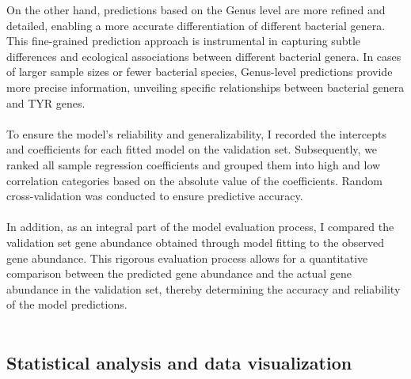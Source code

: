 \documentclass[12pt]{article}
\begin{document}
On the other hand, predictions based on the Genus level are more refined and detailed, enabling a more accurate differentiation of different bacterial genera. This fine-grained prediction approach is instrumental in capturing subtle differences and ecological associations between different bacterial genera. In cases of larger sample sizes or fewer bacterial species, Genus-level predictions provide more precise information, unveiling specific relationships between bacterial genera and TYR genes.\\\\
To ensure the model's reliability and generalizability, I recorded the intercepts and coefficients for each fitted model on the validation set. Subsequently, we ranked all sample regression coefficients and grouped them into high and low correlation categories based on the absolute value of the coefficients. Random cross-validation was conducted to ensure predictive accuracy.\\\\
In addition, as an integral part of the model evaluation process, I compared the validation set gene abundance obtained through model fitting to the observed gene abundance. This rigorous evaluation process allows for a quantitative comparison between the predicted gene abundance and the actual gene abundance in the validation set, thereby determining the accuracy and reliability of the model predictions.\\\\

\subsection{Statistical analysis and data visualization}
\end{document}
